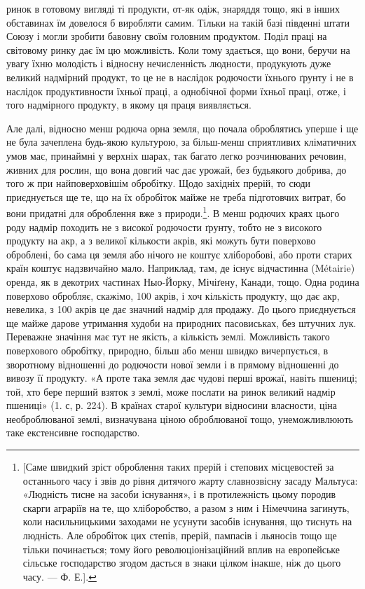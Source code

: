 ринок в готовому вигляді ті продукти, от-як одіж, знаряддя тощо, які в інших
обставинах їм довелося б виробляти самим. Тільки на такій базі південні штати
Союзу і могли зробити бавовну своїм головним продуктом. Поділ праці на світовому
ринку дає їм цю можливість. Коли тому здається, що вони, беручи
на увагу їхню молодість і відносну нечисленність людности, продукують дуже
великий надмірний продукт, то це не в наслідок родючости їхнього ґрунту і не
в наслідок продуктивности їхньої праці, а однобічної форми їхньої праці, отже,
і того надмірного продукту, в якому ця праця виявляється.

Але далі, відносно менш родюча орна земля, що почала оброблятись уперше
і ще не була зачеплена будь-якою культурою, за більш-менш сприятливих
кліматичних умов має, принаймні у верхніх шарах, так багато легко розчинюваних
речовин, живних для рослин, що вона довгий час дає урожай, без будьякого
добрива, до того ж при найповерховішім обробітку. Щодо західніх прерій,
то сюди приєднується ще те, що на їх обробіток майже не треба підготовчих
витрат, бо вони придатні для оброблення вже з природи.\footnote{
[Саме швидкий зріст оброблення таких прерій і степових місцевостей за останнього часу і звів до
рівня дитячого жарту славнозвісну засаду Мальтуса: «Людність тисне на засоби існування», і в
протилежність цьому породив скарги аграріїв на те, що хліборобство, а разом з ним і Німеччина
загинуть, коли насильницькими заходами не усунути засобів існування, що тиснуть на людність. Але
обробіток цих степів, прерій, пампасів і льяносів тощо ще тільки починається; тому його
революціонізаційний вплив на европейське сільське господарство згодом дасться в знаки цілком інакше,
ніж до цього часу. — Ф. Е.].
}. В менш родючих
краях цього роду надмір походить не з високої родючости ґрунту, тобто не з
високого продукту на акр, а з великої кількости акрів, які можуть бути поверхово
оброблені, бо сама ця земля або нічого не коштує хліборобові, або проти
старих країн коштує надзвичайно мало. Наприклад, там, де існує відчастинна
(Métairie) оренда, як в декотрих частинах Ныо-Йорку, Мічіґену, Канади, тощо.
Одна родина поверхово обробляє, скажімо, 100 акрів, і хоч кількість продукту,
що дає акр, невелика, з 100 акрів це дає значний надмір для продажу. До
цього приєднується ще майже дарове утримання худоби на природних пасовиськах,
без штучних лук. Переважне значіння має тут не якість, а кількість землі.
Можливість такого поверхового обробітку, природно, більш або менш швидко
вичерпується, в зворотному відношенні до родючости нової земли і в прямому відношенні до вивозу її
продукту. «А проте така земля дає чудові перші врожаї, навіть
пшениці; той, хто бере перший взяток з землі, може послати на ринок великий
надмір пшениці» (1. с, р. 224). В країнах старої культури відносини власности,
ціна необроблюваної землі, визначувана ціною оброблюваної тощо, унеможливлюють
таке екстенсивне господарство.

